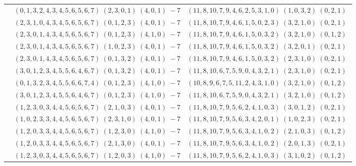 \documentclass[11pt]{article}
\begin{document}
\begin{longtable}[l]{|c|c|c|}
 \cline{2-3} 
 & $(0 ,1 ,3 ,2 ,4 ,3 ,4 ,5 ,6 ,5 ,6 ,7) \;(2 ,3 ,0 ,1) \;(4 ,0 ,1) \;-7$ & $(11 ,8 ,10 ,7 ,9 ,4 ,6 ,2 ,5 ,3 ,1 ,0) \;(1 ,0 ,3 ,2) \;(0 ,2 ,1) \;$\\ 
 \cline{2-3} 
 & $(2 ,3 ,1 ,0 ,4 ,3 ,4 ,5 ,6 ,5 ,6 ,7) \;(0 ,1 ,2 ,3) \;(4 ,0 ,1) \;-7$ & $(11 ,8 ,10 ,7 ,9 ,4 ,6 ,1 ,5 ,0 ,2 ,3) \;(3 ,2 ,1 ,0) \;(0 ,2 ,1) \;$\\ 
 \cline{2-3} 
 & $(2 ,3 ,0 ,1 ,4 ,3 ,4 ,5 ,6 ,5 ,6 ,7) \;(0 ,1 ,2 ,3) \;(4 ,1 ,0) \;-7$ & $(11 ,8 ,10 ,7 ,9 ,4 ,6 ,1 ,5 ,0 ,3 ,2) \;(3 ,2 ,1 ,0) \;(0 ,1 ,2) \;$\\ 
 \cline{2-3} 
 & $(2 ,3 ,0 ,1 ,4 ,3 ,4 ,5 ,6 ,5 ,6 ,7) \;(1 ,0 ,2 ,3) \;(4 ,0 ,1) \;-7$ & $(11 ,8 ,10 ,7 ,9 ,4 ,6 ,1 ,5 ,0 ,3 ,2) \;(3 ,2 ,0 ,1) \;(0 ,2 ,1) \;$\\ 
 \cline{2-3} 
 & $(2 ,3 ,0 ,1 ,4 ,3 ,4 ,5 ,6 ,5 ,6 ,7) \;(0 ,1 ,3 ,2) \;(4 ,0 ,1) \;-7$ & $(11 ,8 ,10 ,7 ,9 ,4 ,6 ,1 ,5 ,0 ,3 ,2) \;(2 ,3 ,1 ,0) \;(0 ,2 ,1) \;$\\ 
 \cline{2-3} 
 & $(3 ,0 ,1 ,2 ,3 ,4 ,5 ,5 ,6 ,4 ,6 ,7) \;(0 ,1 ,3 ,2) \;(4 ,0 ,1) \;-7$ & $(11 ,8 ,10 ,6 ,7 ,5 ,9 ,0 ,4 ,3 ,2 ,1) \;(2 ,3 ,1 ,0) \;(0 ,2 ,1) \;$\\ 
 \cline{2-3} 
 & $(0 ,1 ,3 ,2 ,3 ,4 ,5 ,5 ,6 ,6 ,7 ,4) \;(0 ,1 ,2 ,3) \;(4 ,1 ,0) \;-7$ & $(10 ,8 ,9 ,6 ,7 ,5 ,11 ,2 ,4 ,3 ,1 ,0) \;(3 ,2 ,1 ,0) \;(0 ,1 ,2) \;$\\ 
 \cline{2-3} 
 & $(3 ,0 ,1 ,2 ,3 ,4 ,5 ,5 ,6 ,4 ,6 ,7) \;(0 ,1 ,2 ,3) \;(4 ,1 ,0) \;-7$ & $(11 ,8 ,10 ,6 ,7 ,5 ,9 ,0 ,4 ,3 ,2 ,1) \;(3 ,2 ,1 ,0) \;(0 ,1 ,2) \;$\\ 
 \cline{2-3} 
 & $(1 ,2 ,3 ,0 ,3 ,4 ,4 ,5 ,6 ,5 ,6 ,7) \;(2 ,1 ,0 ,3) \;(4 ,0 ,1) \;-7$ & $(11 ,8 ,10 ,7 ,9 ,5 ,6 ,2 ,4 ,1 ,0 ,3) \;(3 ,0 ,1 ,2) \;(0 ,2 ,1) \;$\\ 
 \cline{2-3} 
 & $(1 ,0 ,2 ,3 ,3 ,4 ,4 ,5 ,6 ,5 ,6 ,7) \;(2 ,3 ,1 ,0) \;(4 ,0 ,1) \;-7$ & $(11 ,8 ,10 ,7 ,9 ,5 ,6 ,3 ,4 ,2 ,0 ,1) \;(1 ,0 ,2 ,3) \;(0 ,2 ,1) \;$\\ 
 \cline{2-3} 
 & $(1 ,2 ,0 ,3 ,3 ,4 ,4 ,5 ,6 ,5 ,6 ,7) \;(1 ,2 ,3 ,0) \;(4 ,1 ,0) \;-7$ & $(11 ,8 ,10 ,7 ,9 ,5 ,6 ,3 ,4 ,1 ,0 ,2) \;(2 ,1 ,0 ,3) \;(0 ,1 ,2) \;$\\ 
 \cline{2-3} 
 & $(1 ,2 ,0 ,3 ,3 ,4 ,4 ,5 ,6 ,5 ,6 ,7) \;(2 ,1 ,3 ,0) \;(4 ,0 ,1) \;-7$ & $(11 ,8 ,10 ,7 ,9 ,5 ,6 ,3 ,4 ,1 ,0 ,2) \;(2 ,0 ,1 ,3) \;(0 ,2 ,1) \;$\\ 
 \cline{2-3} 
 & $(1 ,2 ,3 ,0 ,3 ,4 ,4 ,5 ,6 ,5 ,6 ,7) \;(1 ,2 ,0 ,3) \;(4 ,1 ,0) \;-7$ & $(11 ,8 ,10 ,7 ,9 ,5 ,6 ,2 ,4 ,1 ,0 ,3) \;(3 ,1 ,0 ,2) \;(0 ,1 ,2) \;$\\ 

\end{longtable}
\end{document}
